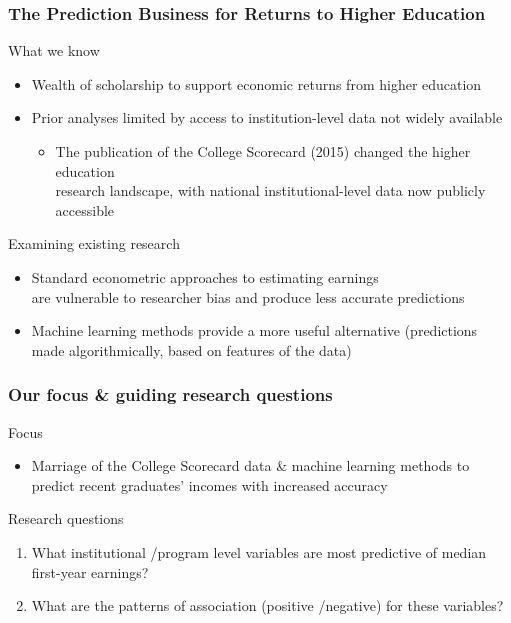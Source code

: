 \documentclass[aspectratio=169, t, 10pt]{beamer}
\begin{document}
\begin{frame}
  \frametitle{The Prediction Business for Returns to Higher Education}
  \begin{block}{What we know}
    \begin{itemize}
    	\item Wealth of scholarship to support economic returns from
          higher education
          \citep{card:1995, Card:1999, Card:2001, doyle2016educearn, Oreopoulous_Petronijevic_2013}
    	\item Prior analyses limited by access to institution-level data not widely available 
   	 \begin{itemize}
    		\item The publication of the College Scorecard (2015) changed the higher education \\
		research landscape, with national institutional-level
                data now publicly accessible
                \citep{obama_2013}
   	 \end{itemize}
    \end{itemize}
  \end{block}
  \begin{block}{Examining existing research}
    \begin{itemize}
    \item Standard econometric approaches to estimating earnings \\
    are vulnerable to researcher bias and produce less accurate predictions
    \item Machine learning methods provide a more useful alternative (predictions \\
    made algorithmically, based on features of the data)
    \end{itemize}
  \end{block}
\end{frame}

\begin{frame}
  \frametitle{Our focus \& guiding research questions}
  \begin{block}{Focus}
    \begin{itemize}
      \item Marriage of the College Scorecard data \& machine learning methods to
        predict recent graduates' incomes with increased accuracy
    \end{itemize}
  \end{block}
  \begin{block}{Research questions}
    \begin{enumerate}
        \item What institutional \slash  program level variables are most
          predictive of median first-year earnings?
        \item What are the patterns of association (positive \slash negative)
          for these variables?
    \end{enumerate}
   \end{block}
\end{frame}
\end{document}
